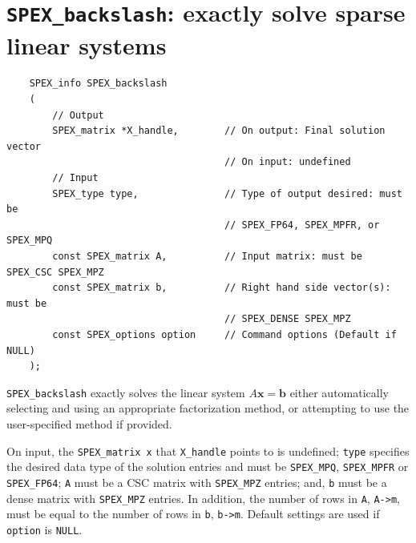 \documentclass[12pt,oneside]{book}
\theoremstyle{definition}
\renewcommand{\b}{\mathbf{b}}
\newcommand{\x}{\mathbf{x}}
\begin{document}
\section{\texttt{SPEX\_backslash}: exactly solve sparse linear systems}
\begin{mdframed}[userdefinedwidth=\textwidth]
{\footnotesize
\begin{verbatim}
    SPEX_info SPEX_backslash
    (
        // Output
        SPEX_matrix *X_handle,        // On output: Final solution vector
                                      // On input: undefined
        // Input
        SPEX_type type,               // Type of output desired: must be
                                      // SPEX_FP64, SPEX_MPFR, or SPEX_MPQ
        const SPEX_matrix A,          // Input matrix: must be SPEX_CSC SPEX_MPZ
        const SPEX_matrix b,          // Right hand side vector(s): must be
                                      // SPEX_DENSE SPEX_MPZ
        const SPEX_options option     // Command options (Default if NULL)
    );
\end{verbatim}
} \end{mdframed}

\verb|SPEX_backslash| exactly solves the linear system $A \x = \b$ either
automatically selecting and using an appropriate factorization method, or
attempting to use the user-specified method if provided.

On input, the \verb|SPEX_matrix x| that \verb|X_handle| points to is undefined;
\verb|type| specifies the desired data type of the solution entries and must be
\verb|SPEX_MPQ|, \verb|SPEX_MPFR| or \verb|SPEX_FP64|; \verb|A| must be a CSC
matrix with \verb|SPEX_MPZ| entries; and, \verb|b| must be a dense matrix with
\verb|SPEX_MPZ| entries. In addition, the number of rows in \verb|A|, \verb|A->m|,
must be equal to the number of rows in \verb|b|, \verb|b->m|. Default settings
are used if \verb|option| is \verb|NULL|.
\end{document}
